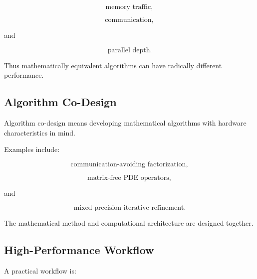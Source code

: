 \[
\boxed{
\text{memory traffic},
}
\]

\[
\boxed{
\text{communication},
}
\]

and

\[
\boxed{
\text{parallel depth}.
}
\]

Thus mathematically equivalent algorithms can have radically different
performance.

\subsection{Algorithm Co-Design}
\label{subsec:algorithm-codesign}

Algorithm co-design means developing mathematical algorithms with hardware
characteristics in mind.

Examples include:

\[
\boxed{
\text{communication-avoiding factorization},
}
\]

\[
\boxed{
\text{matrix-free PDE operators},
}
\]

and

\[
\boxed{
\text{mixed-precision iterative refinement}.
}
\]

The mathematical method and computational architecture are designed
together.

\subsection{High-Performance Workflow}
\label{subsec:hpmc-workflow}

A practical workflow is:

